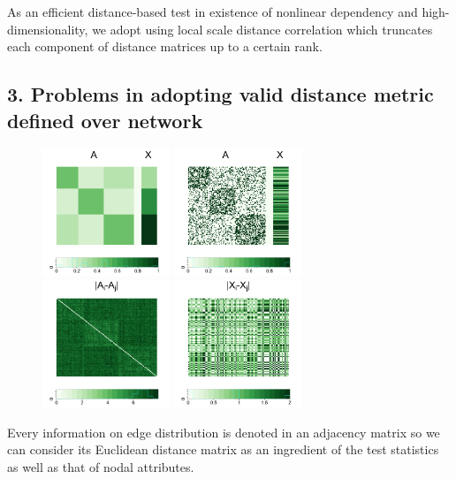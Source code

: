 \documentclass[12pt]{article}
\begin{document}
As an efficient distance-based test in existence of nonlinear dependency and high-dimensionality, we adopt using local scale distance correlation which truncates each component of distance matrices up to a certain rank.

\subsection*{3. Problems in adopting  valid distance metric defined over network}

\begin{figure}[H]
	\centering
	\includegraphics[width=1.5in]{../Figure/pmat.png}
	\includegraphics[width=1.5in]{../Figure/Amat.png}
	\includegraphics[width=1.5in]{../Figure/distA.png}
	\includegraphics[width=1.5in]{../Figure/distX.png}
	\label{fig:matrics}
\end{figure}	
  
Every information on edge distribution is denoted in an adjacency matrix so we can consider its Euclidean distance matrix as an ingredient of the test statistics as well as that of nodal attributes.
  
\end{document}
